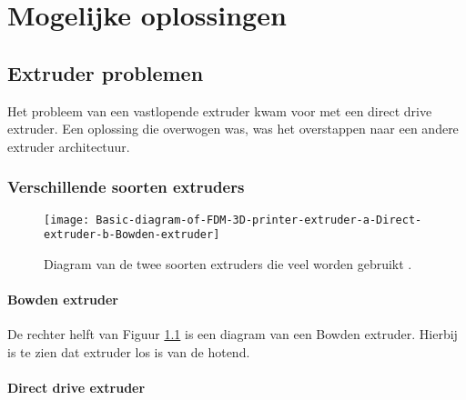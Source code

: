 \chapter{Mogelijke oplossingen}
\label{Mogelijke_oplossingen}

\section{Extruder problemen}

Het probleem van een vastlopende extruder kwam voor met een direct drive
extruder. Een oplossing die overwogen was, was het overstappen naar een andere
extruder architectuur.

\subsection{Verschillende soorten extruders}

\begin{figure}[h]
    \centerline{\texttt{[image: Basic-diagram-of-FDM-3D-printer-extruder-a-Direct-extruder-b-Bowden-extruder]}}
    \caption{Diagram van de twee soorten extruders die veel worden gebruikt \cite{soorten_extruders}.}
    \label{fig:soorten_extruders}
\end{figure}

\subsubsection{Bowden extruder}
\label{ss:Bowden_extruder}

De rechter helft van Figuur \ref{fig:soorten_extruders} \cite{soorten_extruders}
is een diagram van een Bowden extruder. Hierbij is te zien dat \ac{extruder} los
is van de \ac{hotend}.


\subsubsection{Direct drive extruder}
\label{ss:direct_drive_extruder}

